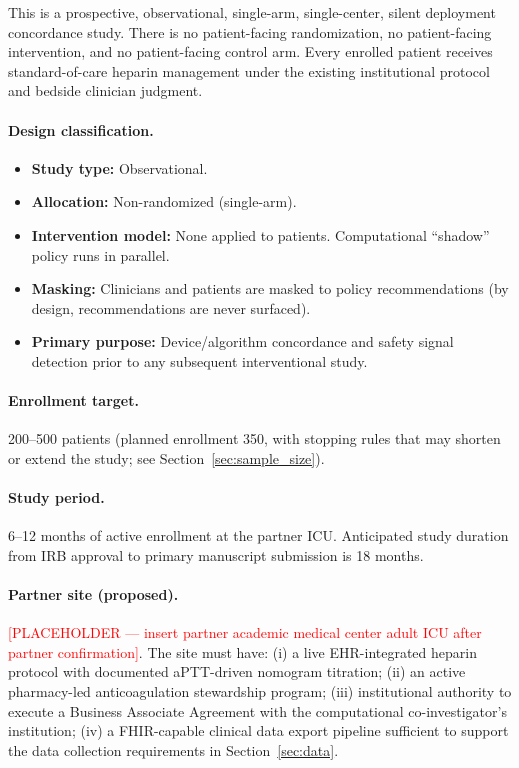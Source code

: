 \documentclass[11pt]{article}
\begin{document}
This is a prospective, observational, single-arm, single-center, silent deployment concordance study. There is no patient-facing randomization, no patient-facing intervention, and no patient-facing control arm. Every enrolled patient receives standard-of-care heparin management under the existing institutional protocol and bedside clinician judgment.

\paragraph{Design classification.}
\begin{itemize}
  \item \textbf{Study type:} Observational.
  \item \textbf{Allocation:} Non-randomized (single-arm).
  \item \textbf{Intervention model:} None applied to patients. Computational ``shadow'' policy runs in parallel.
  \item \textbf{Masking:} Clinicians and patients are masked to policy recommendations (by design, recommendations are never surfaced).
  \item \textbf{Primary purpose:} Device/algorithm concordance and safety signal detection prior to any subsequent interventional study.
\end{itemize}

\paragraph{Enrollment target.} 200--500 patients (planned enrollment 350, with stopping rules that may shorten or extend the study; see Section~\ref{sec:sample_size}).

\paragraph{Study period.} 6--12 months of active enrollment at the partner ICU. Anticipated study duration from IRB approval to primary manuscript submission is 18 months.

\paragraph{Partner site (proposed).} \textcolor{red}{[PLACEHOLDER --- insert partner academic medical center adult ICU after partner confirmation]}. The site must have: (i) a live EHR-integrated heparin protocol with documented aPTT-driven nomogram titration; (ii) an active pharmacy-led anticoagulation stewardship program; (iii) institutional authority to execute a Business Associate Agreement with the computational co-investigator's institution; (iv) a FHIR-capable clinical data export pipeline sufficient to support the data collection requirements in Section~\ref{sec:data}.
\end{document}
